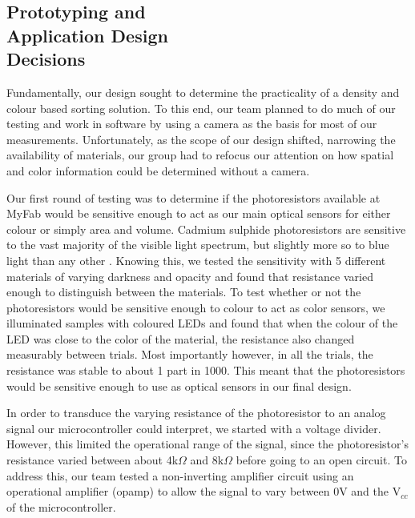 \documentclass[12pt]{article}
\begin{document}
\begin{multicols*}{2}
        \subsection{Prototyping and \\ Application Design \\ Decisions}
            Fundamentally, our design sought to determine the practicality of a density and colour based sorting solution. To this end, our team planned to do much of our testing and work in software by using a camera as the basis for most of our measurements. Unfortunately, as the scope of our design shifted, narrowing the availability of materials, our group had to refocus our attention on how spatial and color information could be determined without a camera.

            Our first round of testing was to determine if the photoresistors available at MyFab would be sensitive enough to act as our main optical sensors for either colour or simply area and volume. Cadmium sulphide photoresistors are sensitive to the vast majority of the visible light spectrum, but slightly more so to blue light than any other \cite{eepower_2017}. Knowing this, we tested the sensitivity with 5 different materials of varying darkness and opacity and found that resistance varied enough to distinguish between the materials. To test whether or not the photoresistors would be sensitive enough to colour to act as color sensors, we illuminated samples with coloured LEDs and found that when the colour of the LED was close to the color of the material, the resistance also changed measurably between trials. Most importantly however, in all the trials, the resistance was stable to about 1 part in 1000. This meant that the photoresistors would be sensitive enough to use as optical sensors in our final design.
            
            In order to transduce the varying resistance of the photoresistor to an analog signal our microcontroller could interpret, we started with a voltage divider. However, this limited the operational range of the signal, since the photoresistor's resistance varied between about 4k$\Omega$ and 8k$\Omega$ before going to an open circuit. To address this, our team tested a non-inverting amplifier circuit using an operational amplifier (opamp) to allow the signal to vary between 0V and the V$_{cc}$ of the microcontroller. 
            

\end{multicols*}
\end{document}
